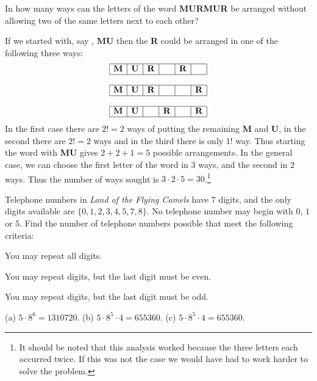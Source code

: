 \begin{exa}
In how many ways can the letters of the word {\bf MURMUR} be
arranged without allowing two of the same letters next to each other?
\begin{sol} If we started with, say , {\bf MU} then the {\bf R} could
be arranged in one of the following three ways:
$$\begin{array}{|c|c|c|c|c|c|}\hline 
{\bf M} & {\bf U} & {\bf R} & \hspace{2ex}  & {\bf R} &  \hspace{2ex}\\ 
\hline
\multicolumn{6}{c}{}\\
\hline 
{\bf M} & {\bf U} & {\bf R} &  \hspace{2ex}   & \hspace{2ex} & {\bf R}\\ 
\hline
\multicolumn{6}{c}{}\\
\hline 
{\bf M} & {\bf U} &  \hspace{2ex}  & {\bf R}  & \hspace{2ex} & {\bf R}\\ 
\hline 
\end{array}
$$
In the first case there are $2! = 2$ ways of putting the remaining {\bf
M} and {\bf U}, in the second there are $2!=2$ ways and in the third
there is only $1!$ way. Thus starting the word with {\bf MU} gives $2 +
2 + 1 = 5$ possible arrangements. In the general case, we can choose
the first letter of the word in $3$ ways, and the second in $2$
ways. Thus the number of ways sought is $3\cdot 2 \cdot 5 = 30$.\footnote{It should
be noted that this analysis worked because the three letters each occurred twice.
If this was not the case we would have had to work harder to solve the problem.}
\end{sol}
\end{exa}

\newpage

\begin{exer}
Telephone numbers in {\em Land of the Flying Camels} have $7$
digits, and the only digits available are $\{0,1, 2,3,4,5, 7, 8\}$.
No telephone number may begin with $0$, $1$ or $5$. Find the number of
telephone numbers possible that meet the following criteria:
\begin{lenum}
\item You may repeat all digits.

\answerlinetwo
 \item You may repeat digits, but the last digit must be even.
 
\answerlinetwo
\item You may repeat digits, but the last digit must be odd.

\answerlinetwo
\end{lenum}
\begin{answer}
(a) $5\cdot 8^6 =1310720$.
(b) $5\cdot 8^5 \cdot 4 = 655360 $.
(c) $5\cdot 8^5 \cdot 4 = 655360 $.
\end{answer}
\end{exer}


